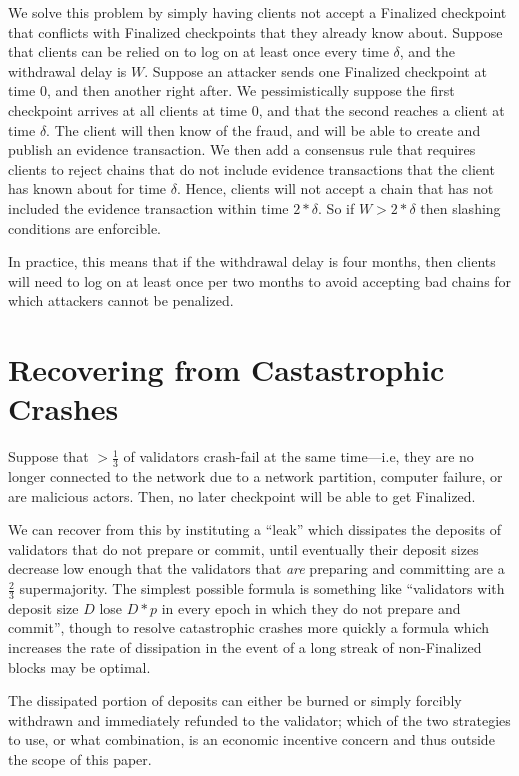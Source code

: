 \documentclass[12pt]{article}
\begin{document}
We solve this problem by simply having clients not accept a Finalized checkpoint that conflicts with Finalized checkpoints that they already know about. Suppose that clients can be relied on to log on at least once every time $\delta$, and the withdrawal delay is $W$. Suppose an attacker sends one Finalized checkpoint at time $0$, and then another right after. We pessimistically suppose the first checkpoint arrives at all clients at time $0$, and that the second reaches a client at time $\delta$. The client will then know of the fraud, and will be able to create and publish an evidence transaction. We then add a consensus rule that requires clients to reject chains that do not include evidence transactions that the client has known about for time $\delta$. Hence, clients will not accept a chain that has not included the evidence transaction within time $2 * \delta$. So if $W > 2 * \delta$ then slashing conditions are enforcible.

In practice, this means that if the withdrawal delay is four months, then clients will need to log on at least once per two months to avoid accepting bad chains for which attackers cannot be penalized.

\section{Recovering from Castastrophic Crashes}
\label{sect:leak}

Suppose that $>\frac{1}{3}$ of validators crash-fail at the same time---i.e, they are no longer connected to the network due to a network partition, computer failure, or are malicious actors. Then, no later checkpoint will be able to get Finalized.

We can recover from this by instituting a ``leak'' which dissipates the deposits of validators that do not prepare or commit, until eventually their deposit sizes decrease low enough that the validators that \textit{are} preparing and committing are a $\frac{2}{3}$ supermajority. The simplest possible formula is something like ``validators with deposit size $D$ lose $D * p$ in every epoch in which they do not prepare and commit'', though to resolve catastrophic crashes more quickly a formula which increases the rate of dissipation in the event of a long streak of non-Finalized blocks may be optimal.

The dissipated portion of deposits can either be burned or simply forcibly withdrawn and immediately refunded to the validator; which of the two strategies to use, or what combination, is an economic incentive concern and thus outside the scope of this paper.
\end{document}
